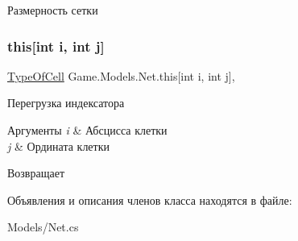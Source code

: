 Размерность сетки 

\mbox{\label{class_game_1_1_models_1_1_net_af5051726b673aa124d1d6d394ee94970}} 
\subsubsection{\texorpdfstring{this[int i, int j]}{this[int i, int j]}}
{\footnotesize\ttfamily \hyperlink{namespace_game_1_1_enums_ab6782702f41f926eb2b923ee03a88069}{Type\+Of\+Cell} Game.\+Models.\+Net.\+this\mbox{[}int i, int j\mbox{]}\hspace{0.3cm}{\ttfamily [get]}, {\ttfamily [set]}}



Перегрузка индексатора 


\begin{DoxyParams}{Аргументы}
{\em i} & Абсцисса клетки\\
\hline
{\em j} & Ордината клетки\\
\hline
\end{DoxyParams}
\begin{DoxyReturn}{Возвращает}

\end{DoxyReturn}


Объявления и описания членов класса находятся в файле\+:\begin{DoxyCompactItemize}
\item 
Models/Net.\+cs\end{DoxyCompactItemize}
